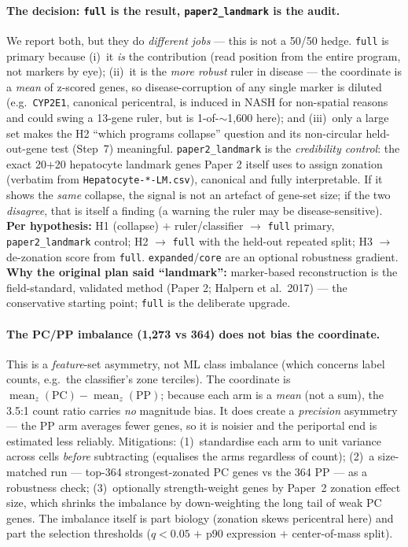 \documentclass[11pt]{article}
\newcommand{\code}[1]{\texttt{\small #1}}
\begin{document}
\paragraph{The decision: \code{full} is the result, \code{paper2\_landmark} is the audit.}
We report both, but they do \emph{different jobs} --- this is not a 50/50 hedge.
\code{full} is primary because (i)~it \emph{is} the contribution (read position from the entire
program, not markers by eye); (ii)~it is the \emph{more robust} ruler in disease --- the coordinate is
a \emph{mean} of z-scored genes, so disease-corruption of any single marker is diluted (e.g.\
\code{CYP2E1}, canonical pericentral, is induced in NASH for non-spatial reasons and could swing a
13-gene ruler, but is 1-of-$\sim$1{,}600 here); and (iii)~only a large set makes the H2 ``which
programs collapse'' question and its non-circular held-out-gene test (Step~7) meaningful.
\code{paper2\_landmark} is the \emph{credibility control}: the exact 20$+$20 hepatocyte landmark genes
Paper 2 itself uses to assign zonation (verbatim from \code{Hepatocyte-*-LM.csv}), canonical and fully
interpretable. If it shows the \emph{same} collapse, the signal is not an artefact of
gene-set size; if the two \emph{disagree}, that is itself a finding (a warning the ruler may be
disease-sensitive). \textbf{Per hypothesis:} H1 (collapse) $+$ ruler/classifier $\to$ \code{full}
primary, \code{paper2\_landmark} control; H2 $\to$ \code{full} with the held-out repeated split;
H3 $\to$ de-zonation score from \code{full}. \code{expanded}/\code{core} are an optional robustness
gradient. \textbf{Why the original plan said ``landmark'':} marker-based reconstruction is the
field-standard, validated method (Paper 2; Halpern et al.\ 2017) --- the conservative starting point;
\code{full} is the deliberate upgrade.

\paragraph{The PC/PP imbalance (1{,}273 vs 364) does not bias the coordinate.}
This is a \emph{feature}-set asymmetry, not ML class imbalance (which concerns label counts, e.g.\ the
classifier's zone terciles). The coordinate is $\operatorname{mean}_z(\text{PC}) -
\operatorname{mean}_z(\text{PP})$; because each arm is a \emph{mean} (not a sum), the 3.5:1 count ratio
carries \emph{no} magnitude bias. It does create a \emph{precision} asymmetry --- the PP arm averages
fewer genes, so it is noisier and the periportal end is estimated less reliably. Mitigations:
(1)~standardise each arm to unit variance across cells \emph{before} subtracting (equalises the arms
regardless of count); (2)~a size-matched run --- top-364 strongest-zonated PC genes vs the 364 PP --- as
a robustness check; (3)~optionally strength-weight genes by Paper~2 zonation effect size, which shrinks
the imbalance by down-weighting the long tail of weak PC genes. The imbalance itself is part biology
(zonation skews pericentral here) and part the selection thresholds ($q<0.05$ $+$ p90 expression $+$
center-of-mass split).
\end{document}

